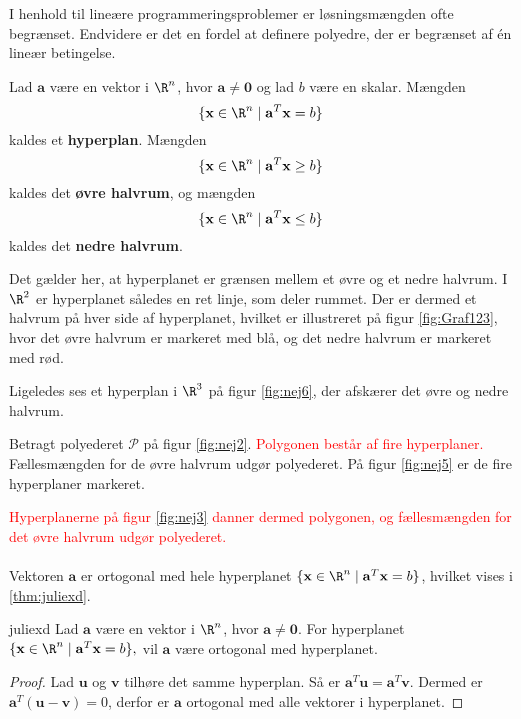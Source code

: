 %
I henhold til lineære programmeringsproblemer er løsningsmængden ofte begrænset.
Endvidere er det en fordel at definere polyedre, der er begrænset af én lineær betingelse. 
%
\begin{defn}{}{}
Lad $\mathbf{a}$ være en vektor i $\R^n$, hvor $\mathbf{a} \neq \mathbf{0}$ og lad $b$ være en skalar.
Mængden $$\{\textbf{x} \in \R^n \mid \mathbf{a}^T \mathbf{x}=b\}$$ kaldes et \textbf{hyperplan}.
%
Mængden $$\{\textbf{x} \in \R^n \mid \mathbf{a}^T \mathbf{x} \geq b\}$$ kaldes det \textbf{øvre halvrum}, og
mængden $$\{\textbf{x} \in \R^n \mid \mathbf{a}^T \mathbf{x} \leq b\}$$ kaldes det \textbf{nedre halvrum}.
\end{defn}
\noindent
%
Det gælder her, at hyperplanet er grænsen mellem et øvre og et nedre halvrum.
I $\R^2$ er hyperplanet således en ret linje, som deler rummet. 
Der er dermed et halvrum på hver side af hyperplanet, hvilket er illustreret på figur \ref{fig:Graf123}, hvor det øvre halvrum er markeret med blå, og det nedre halvrum er markeret med rød. 
%
%

%
Ligeledes ses et hyperplan i $\R^3$ på figur \ref{fig:nej6}, der afskærer det øvre og nedre halvrum.
%
%

%
Betragt polyederet $\mathcal{P}$ på figur \ref{fig:nej2}. 
\textcolor{red}{Polygonen består af fire hyperplaner.}
Fællesmængden for de øvre halvrum udgør polyederet.
På figur \ref{fig:nej5} er de fire hyperplaner markeret. 
%
%

%
\textcolor{red}{Hyperplanerne på figur \ref{fig:nej3} danner dermed polygonen, og fællesmængden for det øvre halvrum udgør polyederet.}
\\\\
%
%
%
Vektoren $\textbf{a}$ er ortogonal med hele hyperplanet $\{\textbf{x} \in \R^n \mid \mathbf{a}^T \mathbf{x}=b\}$, hvilket vises i \ref{thm:juliexd}. 
%
\begin{thm}{}{juliexd}
Lad $\mathbf{a}$ være en vektor i $\R^n$, hvor 
$\mathbf{a} \neq \mathbf{0}.$
For hyperplanet 
$\{\textbf{x} \in \R^n \mid \mathbf{a}^T \mathbf{x}=b\},$ 
vil $\mathbf{a}$ være ortogonal med hyperplanet.
\end{thm}
%
\begin{proof}
Lad $\mathbf{u}$ og $\mathbf{v}$ tilhøre det samme hyperplan. 
Så er $\mathbf{a}^T\textbf{u}=\mathbf{a}^T\textbf{v}.$
Dermed er $\mathbf{a}^T(\textbf{u}-\textbf{v})=0$, derfor er $\mathbf{a}$ ortogonal med alle vektorer i hyperplanet. 
\end{proof}